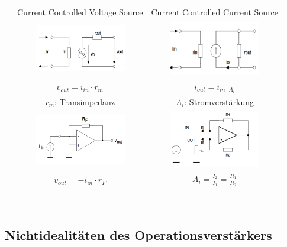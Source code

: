 \begin{tabular}{|c|c|c|}
		& Current Controlled Voltage Source	& Current Controlled Current Source \\ \cline{2-3}
		& \includegraphics[width=4cm,trim=0 0 0 -5]{./bilder/ccvs.png}	
		& \includegraphics[width=4cm,trim=0 0 0 -5]{./bilder/cccs.png}  \\ \cline{2-3}
		& $v_{out}=i_{in} \cdot r_m$  & $i_{out} = i_{in \cdot A_i}$  \\
		& $r_m$: Transimpedanz  & $A_i$: Stromverstärkung \\ \cline{2-3}
		& \includegraphics[width=4cm,trim=0 0 0 -5]{./bilder/tia.png}
		& \includegraphics[width=4cm,trim=0 0 0 -5]{./bilder/cccs-schaltung.png}		\\ 
		& $v_{out}=-i_{in} \cdot r_F$ & $A_i=\frac{I_2}{I_1}=\frac{R_1}{R_2}$	\\ \hline
	\end{tabular} \\


\subsection{Nichtidealit\"aten des Operationsverst\"arkers}

